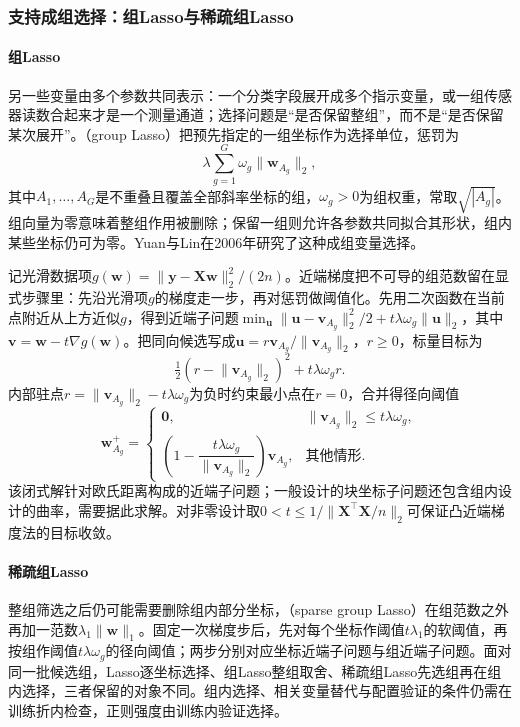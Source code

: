 \subsubsection{支持成组选择：组Lasso与稀疏组Lasso}
\label{sec:regression-group-lasso}

\paragraph{组Lasso}

另一些变量由多个参数共同表示：一个分类字段展开成多个指示变量，或一组传感器读数合起来才是一个测量通道；选择问题是“是否保留整组”，而不是“是否保留某次展开”。（group Lasso）把预先指定的一组坐标作为选择单位，惩罚为
\[
  \lambda\sum_{g=1}^{G}\omega_g\lVert\bm{w}_{A_g}\rVert_2,
\]
其中$A_1,\ldots,A_G$是不重叠且覆盖全部斜率坐标的组，$\omega_g>0$为组权重，常取$\sqrt{|A_g|}$。组向量为零意味着整组作用被删除；保留一组则允许各参数共同拟合其形状，组内某些坐标仍可为零。Yuan与Lin在2006年研究了这种成组变量选择。

记光滑数据项$g(\bm{w})=\lVert\bm{y}-\bm{X}\bm{w}\rVert_2^2/(2n)$。近端梯度把不可导的组范数留在显式步骤里：先沿光滑项$g$的梯度走一步，再对惩罚做阈值化。先用二次函数在当前点附近从上方近似$g$，得到近端子问题$\min_{\bm{u}}\lVert\bm{u}-\bm{v}_{A_g}\rVert_2^2/2+t\lambda\omega_g\lVert\bm{u}\rVert_2$，其中$\bm{v}=\bm{w}-t\nabla g(\bm{w})$。把同向候选写成$\bm{u}=r\bm{v}_{A_g}/\lVert\bm{v}_{A_g}\rVert_2$，$r\geq0$，标量目标为
\[
  \tfrac12(r-\lVert\bm{v}_{A_g}\rVert_2)^2+t\lambda\omega_g r.
\]
内部驻点$r=\lVert\bm{v}_{A_g}\rVert_2-t\lambda\omega_g$为负时约束最小点在$r=0$，合并得径向阈值
\begin{equation}
  \bm{w}_{A_g}^{+}
  =
  \begin{cases}
    \bm{0},&\lVert\bm{v}_{A_g}\rVert_2\leq t\lambda\omega_g,\\
    \left(1-\dfrac{t\lambda\omega_g}{\lVert\bm{v}_{A_g}\rVert_2}\right)
      \bm{v}_{A_g},&\text{其他情形}.
  \end{cases}
  \label{eq:regression-group-prox}
\end{equation}
该闭式解针对欧氏距离构成的近端子问题；一般设计的块坐标子问题还包含组内设计的曲率，需要据此求解。对非零设计取$0<t\leq1/\lVert\bm{X}^{\top}\bm{X}/n\rVert_2$可保证凸近端梯度法的目标收敛。

\paragraph{稀疏组Lasso}

整组筛选之后仍可能需要删除组内部分坐标，（sparse group Lasso）在组范数之外再加一范数$\lambda_1\lVert\bm{w}\rVert_1$。固定一次梯度步后，先对每个坐标作阈值$t\lambda_1$的软阈值，再按组作阈值$t\lambda\omega_g$的径向阈值；两步分别对应坐标近端子问题与组近端子问题。面对同一批候选组，Lasso逐坐标选择、组Lasso整组取舍、稀疏组Lasso先选组再在组内选择，三者保留的对象不同。组内选择、相关变量替代与配置验证的条件仍需在训练折内检查，正则强度由训练内验证选择。
